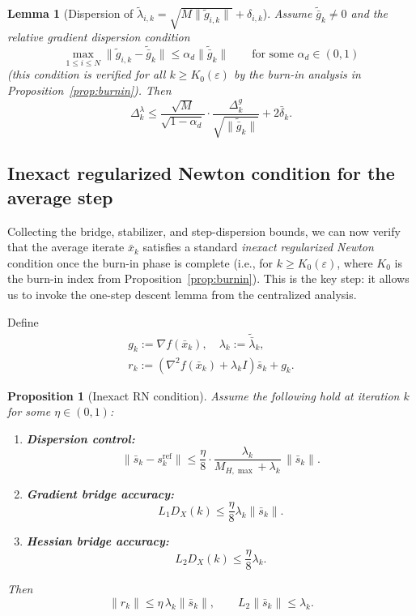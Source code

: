 \documentclass[10pt,twocolumn,letterpaper]{article}
\theoremstyle{compact}
\newtheorem{lemma}[theorem]{Lemma}
\newtheorem{proposition}[theorem]{Proposition}
\theoremstyle{compactremark}
\begin{document}
\begin{lemma}[Dispersion of $\tilde\lambda_{i,k}=\sqrt{M\|\tilde g_{i,k}\|}+\delta_{i,k}$]\label{lem:lambda_dispersion}
Assume $\tilde{\bar g}_k\neq 0$ and the \emph{relative gradient dispersion} condition
\begin{equation}\label{eq:rel_grad_disp}
\max_{1\le i\le N}\|\tilde g_{i,k}-\tilde{\bar g}_k\|\le \alpha_d\|\tilde{\bar g}_k\|
\qquad\text{for some }\alpha_d\in(0,1)
\end{equation}
(this condition is verified for all $k\ge K_0(\varepsilon)$ by the
burn-in analysis in Proposition~\ref{prop:burnin}).
Then
\begin{equation}\label{eq:lambda_disp_bound}
\Delta_k^\lambda
\le
\frac{\sqrt{M}}{\sqrt{1-\alpha_d}}\cdot\frac{\Delta_k^g}{\sqrt{\|\tilde{\bar g}_k\|}}
+2\bar\delta_k.
\end{equation}
\end{lemma}

\subsection{Inexact regularized Newton condition for the average step}\label{ssec:inexact}
Collecting the bridge, stabilizer, and step-dispersion bounds, we can
now verify that the average iterate $\bar x_k$ satisfies a standard
\emph{inexact regularized Newton} condition once the burn-in phase
is complete (i.e., for $k\ge K_0(\varepsilon)$, where $K_0$ is the
burn-in index from Proposition~\ref{prop:burnin}).
This is the key step: it allows us to invoke the one-step descent
lemma from the centralized analysis.

Define
\begin{gather*}
g_k:=\nabla f(\bar x_k),\quad
\lambda_k:=\tilde{\bar\lambda}_k,\\
r_k:=(\nabla^2 f(\bar x_k)+\lambda_k I)\bar s_k+g_k.
\end{gather*}

\begin{proposition}[Inexact RN condition]\label{prop:inexact-rn}
Assume the following hold at iteration $k$ for some $\eta\in(0,1)$:
\begin{enumerate}[leftmargin=1.2em,itemsep=2pt]
\item \textbf{Dispersion control:}
\[
\|\bar s_k-s_k^{\mathrm{ref}}\|\le \frac{\eta}{8}\cdot \frac{\lambda_k}{M_{H,\max}+\lambda_k}\,\|\bar s_k\|.
\]
\item \textbf{Gradient bridge accuracy:}
\[
L_1D_X(k)\le \frac{\eta}{8}\lambda_k\|\bar s_k\|.
\]
\item \textbf{Hessian bridge accuracy:}
\[
L_2D_X(k)\le \frac{\eta}{8}\lambda_k.
\]
\end{enumerate}
Then
\[
\|r_k\|\le \eta\,\lambda_k\|\bar s_k\|,
\qquad
L_2\|\bar s_k\|\le \lambda_k.
\]
\end{proposition}
\end{document}
